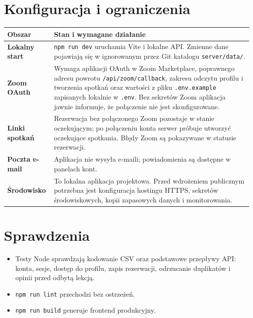 \documentclass[10pt,a4paper]{article}
\begin{document}
\section{Konfiguracja i ograniczenia}
\small
\begin{tabularx}{\textwidth}{>{\bfseries}p{35mm}Y}
\toprule
Obszar & Stan i wymagane działanie\\
\midrule
Lokalny start & \texttt{npm run dev} uruchamia Vite i lokalne API. Zmienne dane pojawiają się w ignorowanym przez Git katalogu \texttt{server/data/}.\\
Zoom OAuth & Wymaga aplikacji OAuth w Zoom Marketplace, poprawnego adresu powrotu \texttt{/api/zoom/callback}, zakresu odczytu profilu i tworzenia spotkań oraz wartości z pliku \texttt{.env.example} zapisanych lokalnie w \texttt{.env}. Bez sekretów Zoom aplikacja jawnie informuje, że połączenie nie jest skonfigurowane.\\
Linki spotkań & Rezerwacja bez połączonego Zoom pozostaje w stanie oczekującym; po połączeniu konta serwer próbuje utworzyć oczekujące spotkania. Błędy Zoom są pokazywane w statusie rezerwacji.\\
Poczta e-mail & Aplikacja nie wysyła e-maili; powiadomienia są dostępne w panelach kont.\\
Środowisko & To lokalna aplikacja projektowa. Przed wdrożeniem publicznym potrzebna jest konfiguracja hostingu HTTPS, sekretów środowiskowych, kopii zapasowych danych i monitorowania.\\
\bottomrule
\end{tabularx}
\normalsize

\section{Sprawdzenia}
\begin{itemize}
\item Testy Node sprawdzają kodowanie CSV oraz podstawowe przepływy API: konta, sesje, dostęp do profilu, zapis rezerwacji, odrzucanie duplikatów i opinii przed odbytą lekcją.
\item \texttt{npm run lint} przechodzi bez ostrzeżeń.
\item \texttt{npm run build} generuje frontend produkcyjny.
\end{itemize}
\end{document}
